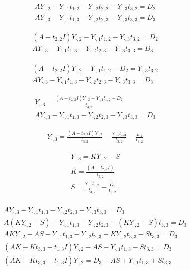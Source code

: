 \documentclass[]{article}
\begin{document}
\begin{gather}
	AY_{\cdot,2} - Y_{\cdot,1}t_{1,2} -	Y_{\cdot,2}t_{2,2} -	Y_{\cdot,3}t_{3,2}= D_{2}\\
	AY_{\cdot,3} -  Y_{\cdot,1}t_{1,3} -	Y_{\cdot,2}t_{2,3} -	Y_{\cdot,3}t_{3,3}= D_{3}
\end{gather}

\begin{gather}
(A-t_{2,2}I)Y_{\cdot,2}- Y_{\cdot,1}t_{1,2} -	Y_{\cdot,3}t_{3,2}= D_{2}\\
AY_{\cdot,3} -  Y_{\cdot,1}t_{1,3} -	Y_{\cdot,2}t_{2,3}-	Y_{\cdot,3}t_{3,3}= D_{3}
\end{gather}

\begin{gather}
(A-t_{2,2}I)Y_{\cdot,2} - Y_{\cdot,1}t_{1,2} - D_{2}= Y_{\cdot,3}t_{3,2}\\
AY_{\cdot,3} -  Y_{\cdot,1}t_{1,3} -	Y_{\cdot,2}t_{2,3} -Y_{\cdot,3}t_{3,3}= D_{3}
\end{gather}

\begin{gather}
Y_{\cdot,3} = \frac{(A-t_{2,2}I)Y_{\cdot,2} - Y_{\cdot,1}t_{1,2} - D_{2}}{t_{3,2}}\\
AY_{\cdot,3} -  Y_{\cdot,1}t_{1,3} -	Y_{\cdot,2}t_{2,3} -	Y_{\cdot,3}t_{3,3}= D_{3}
\end{gather}


\begin{gather}
Y_{\cdot,3} = \frac{(A-t_{2,2}I)Y_{\cdot,2}}{t_{3,2}} - \frac{Y_{\cdot,1}t_{1,2}}{t_{3,2}} -\frac{D_{2}}{t_{3,2}}
\end{gather}

\begin{gather}
Y_{\cdot,3} = KY_{\cdot,2} - S\\
K = \frac{(A-t_{2,2}I)}{t_{3,2}}\\
S=\frac{Y_{\cdot,1}t_{1,2}}{t_{3,2}}-\frac{D_{2}}{t_{3,2}}\\
\end{gather}

\begin{gather}
AY_{\cdot,3} -  Y_{\cdot,1}t_{1,3} -	Y_{\cdot,2}t_{2,3} -	Y_{\cdot,3}t_{3,3}= D_{3}\\
A(KY_{\cdot,2}-S) -  Y_{\cdot,1}t_{1,3} -	Y_{\cdot,2}t_{2,3} -	(KY_{\cdot,2}-S) t_{3,3}= D_{3}\\
AKY_{\cdot,2}-AS -  Y_{\cdot,1}t_{1,3} -	Y_{\cdot,2}t_{2,3} -	KY_{\cdot,2}t_{3,3}-St_{3,3} = D_{3}\\
(AK-Kt_{3,3}-t_{1,3}I)Y_{\cdot,2}-AS - Y_{\cdot,1}t_{1,3} -St_{3,3} = D_{3}\\
(AK-Kt_{3,3}-t_{1,3}I)Y_{\cdot,2} = D_{3} + AS + Y_{\cdot,1}t_{1,3} + St_{3,3}\\
\end{gather}
\end{document}
